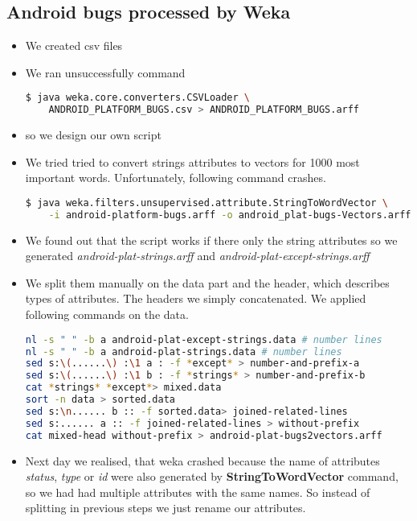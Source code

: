 \subsection*{Android bugs processed by Weka} %
\label{sub:Android bugs preprocessing for Weka}
\begin{itemize}
    \item We created csv files
    \item We ran unsuccessfully command
\begin{lstlisting}[language=sh]
$ java weka.core.converters.CSVLoader \
    ANDROID_PLATFORM_BUGS.csv > ANDROID_PLATFORM_BUGS.arff
\end{lstlisting}
    \item so we design our own script
    \item  We tried tried to convert strings attributes to vectors for 1000 most important words. Unfortunately, following command crashes.
\begin{lstlisting}[language=sh]
$ java weka.filters.unsupervised.attribute.StringToWordVector \
    -i android-platform-bugs.arff -o android_plat-bugs-Vectors.arff
\end{lstlisting}
    \item We found out that the script works if there only the string attributes so we generated
    {\it android-plat-strings.arff} and {\it android-plat-except-strings.arff}
    \item We split them manually on the data part and the header, which describes types of attributes.
    The headers we simply concatenated.  We applied following commands on the data.
\begin{lstlisting}[language=sh]
nl -s " " -b a android-plat-except-strings.data # number lines
nl -s " " -b a android-plat-strings.data # number lines
sed s:\(......\) :\1 a : -f *except* > number-and-prefix-a
sed s:\(......\) :\1 b : -f *strings* > number-and-prefix-b
cat *strings* *except*> mixed.data
sort -n data > sorted.data
sed s:\n...... b :: -f sorted.data> joined-related-lines
sed s:...... a :: -f joined-related-lines > without-prefix
cat mixed-head without-prefix > android-plat-bugs2vectors.arff
\end{lstlisting}
    \item Next day we realised, that weka crashed because the name of attributes {\it status}, {\it type} or {\it id} were also generated by {\bf StringToWordVector} command, so we had had multiple attributes with the same names. So instead of splitting in previous steps we just rename our attributes.

\end{itemize}
